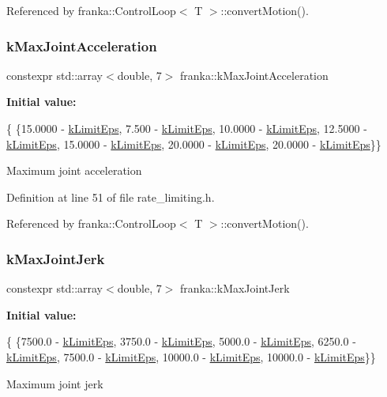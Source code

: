 Referenced by franka\+::\+Control\+Loop$<$ T $>$\+::convert\+Motion().

\mbox{\label{namespacefranka_a826ecf0b7d214df69c1ee416d3e66b93}} 
\subsubsection{\texorpdfstring{k\+Max\+Joint\+Acceleration}{kMaxJointAcceleration}}
{\footnotesize\ttfamily constexpr std\+::array$<$double, 7$>$ franka\+::k\+Max\+Joint\+Acceleration}

{\bfseries Initial value\+:}
\begin{DoxyCode}
\{
    \{15.0000 - \hyperlink{namespacefranka_aad1f9b575274830b8da9e638559d424b}{kLimitEps}, 7.500 - \hyperlink{namespacefranka_aad1f9b575274830b8da9e638559d424b}{kLimitEps}, 10.0000 - 
      \hyperlink{namespacefranka_aad1f9b575274830b8da9e638559d424b}{kLimitEps}, 12.5000 - \hyperlink{namespacefranka_aad1f9b575274830b8da9e638559d424b}{kLimitEps},
     15.0000 - \hyperlink{namespacefranka_aad1f9b575274830b8da9e638559d424b}{kLimitEps}, 20.0000 - \hyperlink{namespacefranka_aad1f9b575274830b8da9e638559d424b}{kLimitEps}, 20.0000 - 
      \hyperlink{namespacefranka_aad1f9b575274830b8da9e638559d424b}{kLimitEps}\}\}
\end{DoxyCode}
Maximum joint acceleration 

Definition at line 51 of file rate\+\_\+limiting.\+h.



Referenced by franka\+::\+Control\+Loop$<$ T $>$\+::convert\+Motion().

\mbox{\label{namespacefranka_a600a21a6151ff2eee38294293dd8aeec}} 
\subsubsection{\texorpdfstring{k\+Max\+Joint\+Jerk}{kMaxJointJerk}}
{\footnotesize\ttfamily constexpr std\+::array$<$double, 7$>$ franka\+::k\+Max\+Joint\+Jerk}

{\bfseries Initial value\+:}
\begin{DoxyCode}
\{
    \{7500.0 - \hyperlink{namespacefranka_aad1f9b575274830b8da9e638559d424b}{kLimitEps}, 3750.0 - \hyperlink{namespacefranka_aad1f9b575274830b8da9e638559d424b}{kLimitEps}, 5000.0 - 
      \hyperlink{namespacefranka_aad1f9b575274830b8da9e638559d424b}{kLimitEps}, 6250.0 - \hyperlink{namespacefranka_aad1f9b575274830b8da9e638559d424b}{kLimitEps},
     7500.0 - \hyperlink{namespacefranka_aad1f9b575274830b8da9e638559d424b}{kLimitEps}, 10000.0 - \hyperlink{namespacefranka_aad1f9b575274830b8da9e638559d424b}{kLimitEps}, 10000.0 - 
      \hyperlink{namespacefranka_aad1f9b575274830b8da9e638559d424b}{kLimitEps}\}\}
\end{DoxyCode}
Maximum joint jerk 

